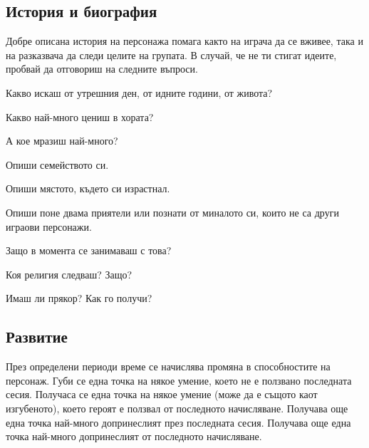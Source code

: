 \subsection{История и биография}
Добре описана история на персонажа помага както на играча да се вживее, така и на разказвача да следи целите на групата.
В случай, че не ти стигат идеите, пробвай да отговориш на следните въпроси.
\begin{itemize*}
\item{Какво искаш от утрешния ден, от идните години, от живота?}
\item{Какво най-много цениш в хората?}
\item{А кое мразиш най-много?}
\item{Опиши семейството си.}
\item{Опиши мястото, където си израстнал.}
\item{Опиши поне двама приятели или познати от миналото си, които не са други играови персонажи.}
\item{Защо в момента се занимаваш с това?}
\item{Коя религия следваш? Защо?}
\item{Имаш ли прякор? Как го получи?}
\end{itemize*}

\subsection{Развитие}
През определени периоди време се начислява промяна в способностите на персонаж.
Губи се една точка на някое умение, което не е ползвано последната сесия.
Получаса се една точка на някое умение (може да е същото каот изгубеното), което героят е ползвал от последното начисляване.
Получава още една точка най-много допринеслият през последната сесия.
Получава още една точка най-много допринеслият от последното начисляване.

